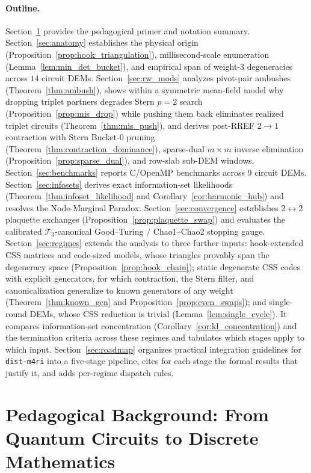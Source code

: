 \documentclass[12pt]{article}
\theoremstyle{definition}
\newcommand{\Tc}{\mathcal{T}_3}
\newcommand{\ttt}[1]{\texttt{#1}}
\begin{document}
\paragraph{Outline.}
Section~\ref{sec:background} provides the pedagogical primer and notation summary. Section~\ref{sec:anatomy}
establishes the physical origin (Proposition~\ref{prop:hook_triangulation}), millisecond-scale enumeration
(Lemma~\ref{lem:min_det_bucket}), and empirical span of weight-3 degeneracies across $14$ circuit DEMs.
Section~\ref{sec:rw_mods} analyzes pivot-pair ambushes (Theorem~\ref{thm:ambush}), shows within a symmetric
mean-field model why dropping triplet partners degrades Stern $p = 2$ search (Proposition~\ref{prop:mis_drop})
while pushing them back eliminates realized triplet circuits (Theorem~\ref{thm:mis_push}), and derives post-RREF
$2 \to 1$ contraction with Stern Bucket-0 pruning (Theorem~\ref{thm:contraction_dominance}), sparse-dual $m \times
m$ inverse elimination (Proposition~\ref{prop:sparse_dual}), and row-slab sub-DEM windows.
Section~\ref{sec:benchmarks} reports C/OpenMP benchmarks across $9$ circuit DEMs. Section~\ref{sec:infosets}
derives exact information-set likelihoods (Theorem~\ref{thm:infoset_likelihood} and
Corollary~\ref{cor:harmonic_hub}) and resolves the Node-Marginal Paradox. Section~\ref{sec:convergence}
establishes $2 \leftrightarrow 2$ plaquette exchanges (Proposition~\ref{prop:plaquette_swap}) and evaluates the
calibrated $\Tc$-canonical Good--Turing / Chao1--Chao2 stopping gauge. Section~\ref{sec:regimes} extends the analysis
to three further inputs: hook-extended CSS matrices and code-sized models, whose triangles provably span the
degeneracy space (Proposition~\ref{prop:hook_chain}); static degenerate CSS codes with explicit generators, for which
contraction, the Stern filter, and canonicalization generalize to known generators of any weight
(Theorem~\ref{thm:known_gen} and Proposition~\ref{prop:even_swaps}); and single-round DEMs, whose CSS reduction is
trivial (Lemma~\ref{lem:single_cycle}). It compares information-set concentration (Corollary~\ref{cor:kl_concentration})
and the termination criteria across these regimes and tabulates which stages apply to which input.
Section~\ref{sec:roadmap} organizes practical integration guidelines for \ttt{dist-m4ri} into a five-stage pipeline,
cites for each stage the formal results that justify it, and adds per-regime dispatch rules.

\section{Pedagogical Background: From Quantum Circuits to Discrete Mathematics}\label{sec:background}
\end{document}
